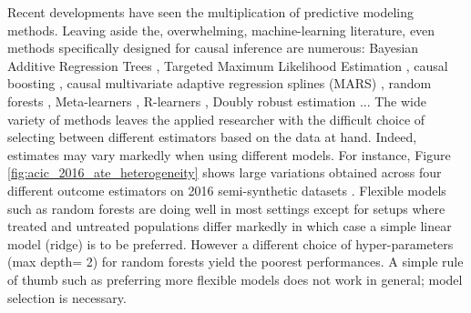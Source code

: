 \documentclass[10pt]{article}
\begin{document}
\begin{multicols}{2}
    Recent developments have seen the multiplication of predictive modeling
    methods. Leaving aside the, overwhelming, machine-learning literature,
    even methods specifically designed for causal
    inference are numerous: Bayesian Additive Regression Trees
    \cite{hill_bayesian_2011}, Targeted Maximum Likelihood Estimation
    \cite{laan_targeted_2011,schuler_targeted_2017}, causal boosting
    \cite{powers_methods_2018}, causal multivariate adaptive regression
    splines (MARS) \cite{powers_methods_2018}, random forests
    \cite{wager_estimation_2018, athey_generalized_2019},
    Meta-learners \cite{kunzel_metalearners_2019}, R-learners
    \cite{nie_quasioracle_2017}, Doubly robust estimation
    \cite{chernozhukov_double_2018}...
    The wide variety of methods leaves the applied researcher with the difficult choice
    of selecting between different estimators based on the data at hand.
    Indeed, estimates may vary markedly when using different
    models. For instance, Figure \ref{fig:acic_2016_ate_heterogeneity} shows
    large variations obtained across four different outcome estimators on
    2016 semi-synthetic datasets \cite{dorie_automated_2019}. Flexible models
    such as random forests are doing well in most settings except
    for setups where treated and untreated populations differ markedly in
    which case a simple linear model (ridge) is to be preferred.
    However a different choice of hyper-parameters
    (max depth= 2) for random forests yield the poorest performances.
    A simple rule of thumb such as preferring more flexible models does not work in
    general; model selection is necessary.



\end{multicols}
\end{document}
